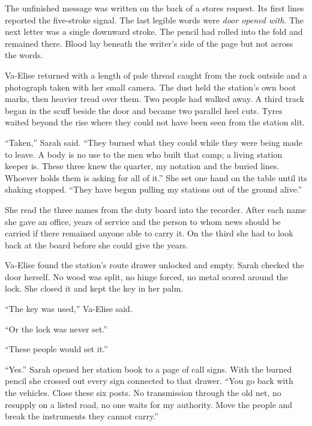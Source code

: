 The unfinished message was written on the back of a stores request. Its first lines reported the five-stroke signal. The last legible words were \emph{door opened with}. The next letter was a single downward stroke. The pencil had rolled into the fold and remained there. Blood lay beneath the writer's side of the page but not across the words.\par

Va-Elise returned with a length of pale thread caught from the rock outside and a photograph taken with her small camera. The dust held the station's own boot marks, then heavier tread over them. Two people had walked away. A third track began in the scuff beside the door and became two parallel heel cuts. Tyres waited beyond the rise where they could not have been seen from the station slit.\par

``Taken,'' Sarah said. ``They burned what they could while they were being made to leave. A body is no use to the men who built that camp; a living station keeper is. These three knew the quarter, my notation and the buried lines. Whoever holds them is asking for all of it.'' She set one hand on the table until its shaking stopped. ``They have begun pulling my stations out of the ground alive.''\par

She read the three names from the duty board into the recorder. After each name she gave an office, years of service and the person to whom news should be carried if there remained anyone able to carry it. On the third she had to look back at the board before she could give the years.\par

Va-Elise found the station's route drawer unlocked and empty. Sarah checked the door herself. No wood was split, no hinge forced, no metal scored around the lock. She closed it and kept the key in her palm.\par

``The key was used,'' Va-Elise said.\par

``Or the lock was never set.''\par

``These people would set it.''\par

``Yes.'' Sarah opened her station book to a page of call signs. With the burned pencil she crossed out every sign connected to that drawer. ``You go back with the vehicles. Close these six posts. No transmission through the old net, no resupply on a listed road, no one waits for my authority. Move the people and break the instruments they cannot carry.''\par

